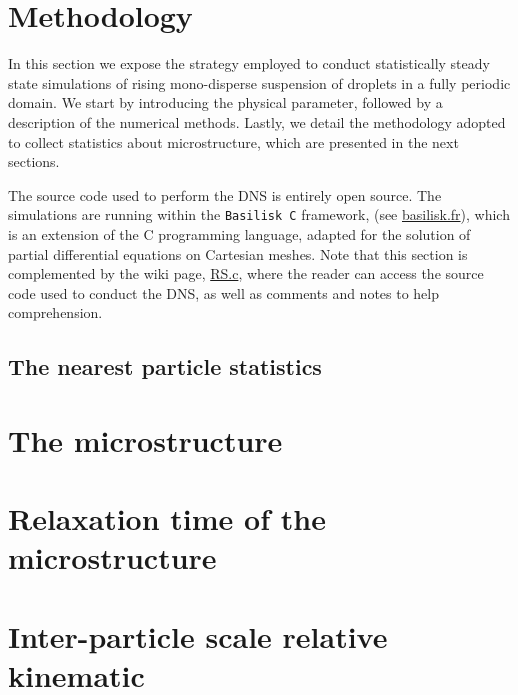 \documentclass[11pt]{My_preprint}
\begin{document}


\section{Methodology}
\label{sec:methodo}
In this section we expose the strategy employed to conduct statistically steady state simulations of rising mono-disperse suspension of droplets in a fully periodic domain. 
We start by introducing the physical parameter, followed by a description of the numerical methods.
Lastly, we detail the methodology adopted to collect statistics about microstructure, which are presented in the next sections.

The source code used to perform the DNS is entirely open source.
The simulations are running within the \texttt{Basilisk C} framework, (see \href{http://basilisk.fr}{basilisk.fr}), which is an extension of the C programming language, adapted for the solution of partial differential equations on Cartesian meshes. 
Note that this section is complemented by the wiki page, \href{http://basilisk.fr/sandbox/fintzin/Rising-Suspenion/RS.c}{RS.c}, where the reader can access the source code used to conduct the DNS, as well as comments and notes to help comprehension. 








\subsection{The nearest particle statistics}




\section{The microstructure}
\label{sec:microstructure}



\section{Relaxation time of the microstructure}
\label{sec:time}



\section{Inter-particle scale relative kinematic}
\label{sec:velocity}

\end{document}
